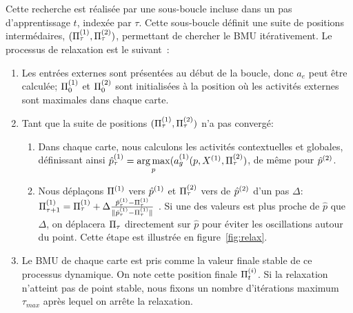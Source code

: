 \documentclass[../main]{subfiles}
\begin{document}
Cette recherche est réalisée par une sous-boucle incluse dans un pas d'apprentissage $t$, indexée par $\tau$. Cette sous-boucle définit une suite de positions intermédaires, $(\Pi^{({1})}_\tau , \Pi^{({2})}_\tau)$, permettant de chercher le BMU itérativement.
Le processus de relaxation est le suivant~:
\begin{enumerate}
\item Les entrées externes sont présentées au début de la boucle, donc $a_e$ peut être calculée; $\Pi^{({1})}_0$ et $\Pi^{({2})}_0$ sont initialisées à la position où les activités externes sont maximales dans chaque carte. 
\item Tant que la suite de positions $(\Pi^{({1})}_\tau,\Pi^{({2})}_\tau)$ n'a pas convergé:
	\begin{enumerate}
	\item Dans chaque carte, nous calculons les activités contextuelles et globales, définissant ainsi $\hat{p}^{({1})}_\tau = \operatorname*{arg\,max}\limits_p(a_g^{({1})}(p,X^{({1})}, \Pi^{({2})}_\tau)$, de même pour $\hat{p}^{({2})}$.
	\item Nous déplaçons $\Pi^{({1})}$ vers $\hat{p}^{({1})}$ et $\Pi^{({2})}_\tau$ vers de $\hat{p}^{({2})}$ d'un pas $\Delta$: $\Pi^{({1})}_{\tau+1} = \Pi^{({1})}_{\tau} + \Delta \frac{\hat{p}^{({1})}_\tau - \Pi^{({1})}_\tau}{\lVert \hat{p}^{({1})}_\tau - \Pi^{({1})}_\tau \rVert}$ .
	Si une des valeurs est plus proche de $\hat{p}$ que $\Delta$, on déplacera $\Pi_\tau$ directement sur $\hat{p}$ pour éviter les oscillations autour du point. Cette étape est illustrée en figure~\ref{fig:relax}.
	\end{enumerate}
\item Le BMU de chaque carte est pris comme la valeur finale stable de ce processus dynamique. On note cette position finale $\Pi^{({i})}_t$.
Si la relaxation n'atteint pas de point stable, nous fixons un nombre d'itérations maximum $\tau_{max}$ après lequel on arrête la relaxation.
\end{enumerate}
\end{document}
